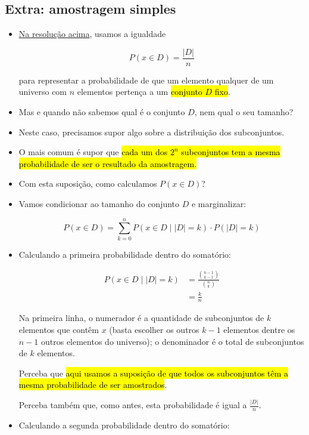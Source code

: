 \documentclass[
  11pt]{report}
\begin{document}
\hypertarget{amostra}{%
\subsection*{Extra: amostragem simples}\label{amostra}}

\begin{itemize}
\item
  \protect\hyperlink{amigos}{Na resolução acima}, usamos a igualdade

  \[
  P(x \in D) = \frac{|D|}{n}
  \]

  para representar a probabilidade de que um elemento qualquer de um universo com $n$ elementos pertença a um {\hl{conjunto $D$ fixo}}.
\item
  Mas e quando não sabemos qual é o conjunto $D$, nem qual o seu tamanho?
\item
  Neste caso, precisamos supor algo sobre a distribuição dos subconjuntos.
\item
  O mais comum é supor que {\hl{cada um dos $2^n$ subconjuntos tem a mesma probabilidade de ser o resultado da amostragem.}}
\item
  Com esta suposição, como calculamos $P(x \in D)$?
\item
  Vamos condicionar ao tamanho do conjunto $D$ e marginalizar:

  \[
  P(x \in D) = \sum_{k = 0}^{n} P(x \in D \mid |D| = k) \cdot P(|D| = k)
  \]
\item
  Calculando a primeira probabilidade dentro do somatório:

  \[
  \begin{aligned}
  P(x \in D \mid |D| = k) 
  &= \frac{\binom{n - 1}{k - 1}}{\binom n k} \\
  &= \frac k n
  \end{aligned}
  \]

  Na primeira linha, o numerador é a quantidade de subconjuntos de $k$ elementos que contêm $x$ (basta escolher os outros $k - 1$ elementos dentre os $n - 1$ outros elementos do universo); o denominador é o total de subconjuntos de $k$ elementos.

  Perceba que {\hl{aqui usamos a suposição de que todos os subconjuntos têm a mesma probabilidade de ser amostrados}}.

  Perceba também que, como antes, esta probabilidade é igual a $\frac{|D|}{n}$.
\item
  Calculando a segunda probabilidade dentro do somatório:


\end{itemize}
\end{document}
